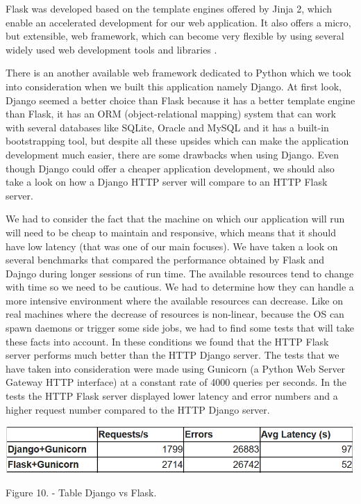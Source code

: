\documentclass[12pt, a4paper]{report}
\begin{document}
Flask was developed based on the template engines offered by Jinja 2, which enable an accelerated development for our web application. It also offers a micro, but extensible, web framework, which can become very flexible by using several widely used web development tools and libraries \cite{Flask1}.
\par 

There is an another available web framework dedicated to Python which we took into consideration when we built this application namely Django. At first look, Django seemed a better choice than Flask because it has a better template engine than Flask, it has an ORM (object-relational mapping) system that can work with several databases like SQLite, Oracle and MySQL and it has a built-in bootstrapping tool, but despite all these upsides which can make the application development much easier, there are some drawbacks when using Django. Even though Django could offer a cheaper application development, we should also take a look on how a Django HTTP server will compare to an HTTP Flask server.
\par 

We had to consider the fact that the machine on which our application will run will need to be cheap to maintain and responsive, which means that it should have low latency (that was one of our main focuses). We have taken a look on several benchmarks that compared the performance obtained by Flask and Dajngo during longer sessions of run time. The available resources tend to change with time so we need to be cautious. We had to determine how they can handle a more intensive environment where the available resources can decrease. Like on real machines where the decrease of resources is non-linear, because the OS can spawn daemons or trigger some side jobs, we had to find some tests that will take these facts into account. In these conditions we found that the HTTP Flask server performs much better than the HTTP Django server. The tests that we have taken into consideration \cite{Flask2} were made using Gunicorn (a Python Web Server Gateway HTTP interface) at a constant rate of 4000 queries per seconds. In the tests the HTTP Flask server displayed lower latency and error numbers and a higher request number compared to the HTTP Django server.
\par 

\medskip
\includegraphics[scale=0.6, center]{django-flask-table.png}
\begin{center}
Figure 10. \cite{Flask2} - Table Django vs Flask.
\end{center}
\end{document}
